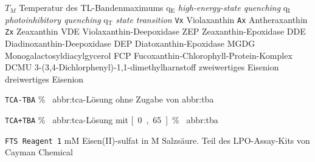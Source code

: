                 {$T_M$}
                {Temperatur des TL-Bandenmaximums}
                {q$_\text{E}$}
                {\textit{high-energy-state quenching}}
                {q$_\text{I}$}
                {\textit{photoinhibitory quenching}}
                {q$_\text{T}$}
                {\textit{state transition}}
                {\texttt{Vx}}
                {Violaxanthin}
                {\texttt{Ax}}
                {Antheraxanthin}
                {\texttt{Zx}}
                {Zeaxanthin}
                {VDE}
                {Violaxanthin-Deepoxidase}
                {ZEP}
                {Zeaxanthin-Epoxidase}
                {DDE}
                {Diadinoxanthin-Deepoxidase}
                {DEP}
                {Diatoxanthin-Epoxidase}
                {MGDG}
                {Monogalactosyldiacylgycerol}
                {FCP}
                {Fucoxanthin-Chlorophyll-Protein-Komplex}
                {DCMU}
                {3-(3,4-Dichlorphenyl)-1,1-dimethylharnstoff}
                {}
                {zweiwertiges Eisenion}
                {}
                {dreiwertiges Eisenion}
                

                {\texttt{TCA-TBA}}
                {\unit[20]{\% } \gls{abbr:tca}-Lösung ohne Zugabe von \gls{abbr:tba}}

                {\texttt{TCA+TBA}}
                {\unit[20]{\% } \gls{abbr:tca}-Lösung mit \unit[0{,}65]{\% } \gls{abbr:tba}}
    
                {\texttt{FTS Reagent 1}}
                {\unit[4,5]{mM} Eisen(II)-sulfat in \unit[0,2]{M} Salzsäure. Teil des LPO-Assay-Kits von Cayman Chemical}

